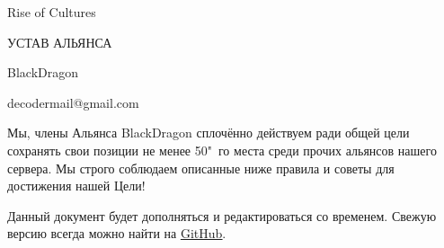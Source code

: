 \documentclass[utf8, 14pt]{roc-class}
\begin{document}
    
    {
        \fancyhead{}
        \fancyfoot{}
        \fancyhead{}
    }
    
    \thispagestyle{firststyle}
    
    \vspace*{\fill}
    \begin{center}
        \Huge
        
        Rise of Cultures
        
        \bigskip
        
        УСТАВ АЛЬЯНСА
        
        BlackDragon
    \end{center}
    \vspace*{\fill}
    \begin{center}
        decodermail@gmail.com
    \end{center}

    \newpage
    
    {
        \hypersetup{linkcolor=black}
        \tableofcontents
    }
    
    \newpage
    
    Мы, члены Альянса BlackDragon сплочённо действуем ради общей цели сохранять свои позиции не менее 50"~го места среди прочих альянсов нашего сервера.
    Мы строго соблюдаем описанные ниже правила и советы для достижения нашей Цели!
    
    \bigskip
    
    Данный документ будет дополняться и редактироваться со временем.
    Свежую версию всегда можно найти на \underline{\href{https://github.com/decodergit/RoC-BlackDragon}{GitHub}}.
    
    
    
    
    
    
    
\end{document}
